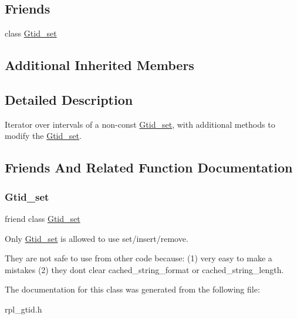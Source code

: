 \subsection*{Friends}
\begin{DoxyCompactItemize}
\item 
class \mbox{\hyperlink{classGtid__set_1_1Interval__iterator_a437ecb1fc027e7507480556761c81936}{Gtid\+\_\+set}}
\end{DoxyCompactItemize}
\subsection*{Additional Inherited Members}


\subsection{Detailed Description}
Iterator over intervals of a non-\/const \mbox{\hyperlink{classGtid__set}{Gtid\+\_\+set}}, with additional methods to modify the \mbox{\hyperlink{classGtid__set}{Gtid\+\_\+set}}. 

\subsection{Friends And Related Function Documentation}
\mbox{\label{classGtid__set_1_1Interval__iterator_a437ecb1fc027e7507480556761c81936}} 
\subsubsection{\texorpdfstring{Gtid\+\_\+set}{Gtid\_set}}
{\footnotesize\ttfamily friend class \mbox{\hyperlink{classGtid__set}{Gtid\+\_\+set}}\hspace{0.3cm}{\ttfamily [friend]}}

Only \mbox{\hyperlink{classGtid__set}{Gtid\+\_\+set}} is allowed to use set/insert/remove.

They are not safe to use from other code because\+: (1) very easy to make a mistakes (2) they don\textquotesingle{}t clear cached\+\_\+string\+\_\+format or cached\+\_\+string\+\_\+length. 

The documentation for this class was generated from the following file\+:\begin{DoxyCompactItemize}
\item 
rpl\+\_\+gtid.\+h\end{DoxyCompactItemize}
